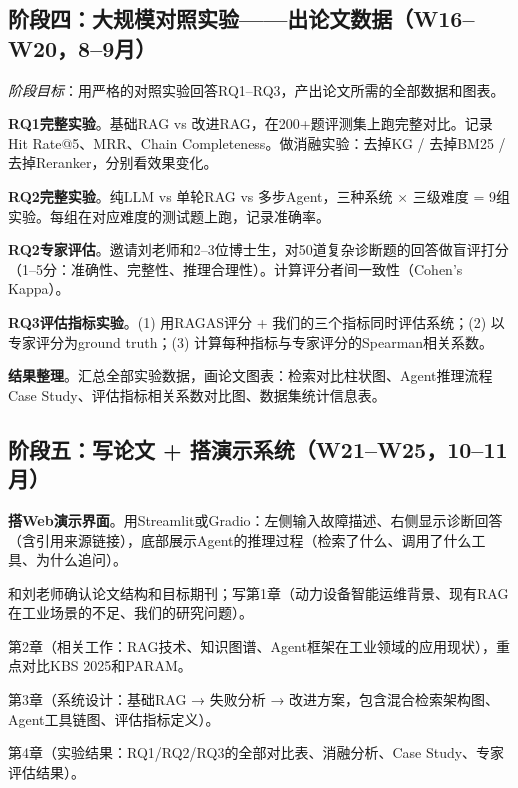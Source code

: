 \documentclass[a4paper, 11pt]{ctexart}
\begin{document}
\subsection{阶段四：大规模对照实验——出论文数据（W16--W20，8--9月）}

\noindent\textit{阶段目标}：用严格的对照实验回答RQ1--RQ3，产出论文所需的全部数据和图表。

\begin{description}[style=nextline, leftmargin=1.2cm, labelwidth=1cm, font=\bfseries\color{tsinghua}]
\item[W16] \textbf{RQ1完整实验}。基础RAG vs 改进RAG，在200+题评测集上跑完整对比。记录Hit Rate@5、MRR、Chain Completeness。做消融实验：去掉KG / 去掉BM25 / 去掉Reranker，分别看效果变化。
\item[W17] \textbf{RQ2完整实验}。纯LLM vs 单轮RAG vs 多步Agent，三种系统 × 三级难度 = 9组实验。每组在对应难度的测试题上跑，记录准确率。
\item[W18] \textbf{RQ2专家评估}。邀请刘老师和2--3位博士生，对50道复杂诊断题的回答做盲评打分（1--5分：准确性、完整性、推理合理性）。计算评分者间一致性（Cohen's Kappa）。
\item[W19] \textbf{RQ3评估指标实验}。(1) 用RAGAS评分 + 我们的三个指标同时评估系统；(2) 以专家评分为ground truth；(3) 计算每种指标与专家评分的Spearman相关系数。
\item[W20] \textbf{结果整理}。汇总全部实验数据，画论文图表：检索对比柱状图、Agent推理流程Case Study、评估指标相关系数对比图、数据集统计信息表。
\end{description}

\subsection{阶段五：写论文 + 搭演示系统（W21--W25，10--11月）}

\begin{description}[style=nextline, leftmargin=1.2cm, labelwidth=1cm, font=\bfseries\color{tsinghua}]
\item[W21] \textbf{搭Web演示界面}。用Streamlit或Gradio：左侧输入故障描述、右侧显示诊断回答（含引用来源链接），底部展示Agent的推理过程（检索了什么、调用了什么工具、为什么追问）。
\item[W22] 和刘老师确认论文结构和目标期刊；写第1章（动力设备智能运维背景、现有RAG在工业场景的不足、我们的研究问题）。
\item[W23] 第2章（相关工作：RAG技术、知识图谱、Agent框架在工业领域的应用现状），重点对比KBS 2025和PARAM。
\item[W24] 第3章（系统设计：基础RAG → 失败分析 → 改进方案，包含混合检索架构图、Agent工具链图、评估指标定义）。
\item[W25] 第4章（实验结果：RQ1/RQ2/RQ3的全部对比表、消融分析、Case Study、专家评估结果）。
\end{description}
\end{document}
